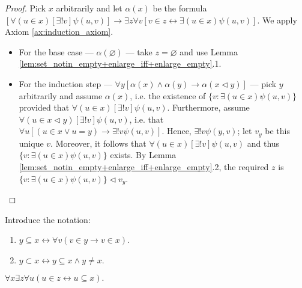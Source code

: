 \begin{proof}
    \leanok
    Pick $x$ arbitrarily and let $\alpha (x)$ be the formula $[\forall (u \in x) [\exists! v] \psi (u,v)]\rightarrow \exists z \forall v [v\in z \leftrightarrow \exists(u \in x) \psi (u,v)]$.
    We apply Axiom \ref{ax:induction_axiom}.
    \begin{itemize}
        \item For the base case — $\alpha (\varnothing)$ — take $z=\varnothing$ and use Lemma \ref{lem:set_notin_empty+enlarge_iff+enlarge_empty}.1.
        \item For the induction step — $\forall y[\alpha(x) \land \alpha(y) \rightarrow \alpha(x \lhd y)]$ — 
        pick $y$ arbitrarily and assume $\alpha(x)$, i.e. the existence of $\{v : \exists (u\in x)\psi(u,v)\}$ provided that $\forall (u \in x) [\exists! v] \psi (u,v)$.
        Furthermore, assume $\forall (u \in x \lhd y) [\exists! v] \psi (u,v)$, i.e. that $\forall u [(u \in x \lor u = y) \rightarrow \exists! v \psi (u,v)]$.
        Hence, $\exists! v \psi (y,v)$; let $v_y$ be this unique $v$. Moreover, it follows that $\forall (u \in x) [\exists! v] \psi (u,v)$ and thus $\{v : \exists (u\in x)\psi(u,v)\}$ exists.
        By Lemma \ref{lem:set_notin_empty+enlarge_iff+enlarge_empty}.2, the required $z$ is $\{v : \exists (u\in x)\psi(u,v)\} \lhd v_y$.
    \end{itemize}
\end{proof}

\begin{definition}
    \label{def:SubsetEq+Subset}
    \leanok
    Introduce the notation:
    \begin{enumerate}
        \item $y \subseteq x \leftrightarrow \forall v (v\in y \rightarrow v \in x)$.
        \item $y \subset x \leftrightarrow y \subseteq x \land y \neq x$.
    \end{enumerate}  
\end{definition}

\begin{theorem}
    \label{thm:exists_powerSet}
    \leanok
    $\forall x \exists z \forall u (u\in z \leftrightarrow u \subseteq x).$
\end{theorem}

